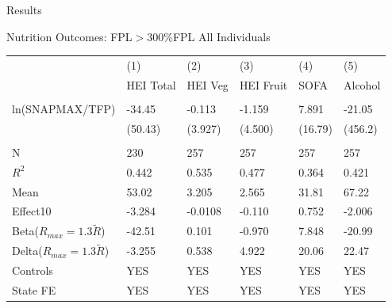\documentclass{beamer}
\begin{document}
\begin{frame}{Results}
\begin{table}{Nutrition Outcomes: FPL$>300$\%FPL All Individuals}
\begin{adjustbox}{max width=\textwidth}
\centering
\begin{tabular}{llllll}
\toprule
 & (1) & (2) & (3) & (4) & (5) \\
 & HEI Total & HEI Veg & HEI Fruit & SOFA & Alcohol \\
 \midrule
 \\
ln(SNAPMAX/TFP) & -34.45 & -0.113 & -1.159 & 7.891 & -21.05 \\
 & (50.43) & (3.927) & (4.500) & (16.79) & (456.2) \\
 \\
N & 230 & 257 & 257 & 257 & 257 \\
$R^2$ & 0.442 & 0.535 & 0.477 & 0.364 & 0.421 \\
Mean & 53.02 & 3.205 & 2.565 & 31.81 & 67.22 \\
Effect10 & -3.284 & -0.0108 & -0.110 & 0.752 & -2.006 \\
Beta($R_{max}=1.3\tilde{R}$)& -42.51 & 0.101 & -0.970 & 7.848 & -20.99 \\
Delta($R_{max}=1.3\tilde{R}$)& -3.255 & 0.538 & 4.922 & 20.06 & 22.47 \\
Controls & YES & YES & YES & YES & YES \\
State FE & YES & YES & YES & YES & YES \\
\bottomrule
\end{tabular}
\end{adjustbox}
\end{table}
\end{frame}
\end{document}
